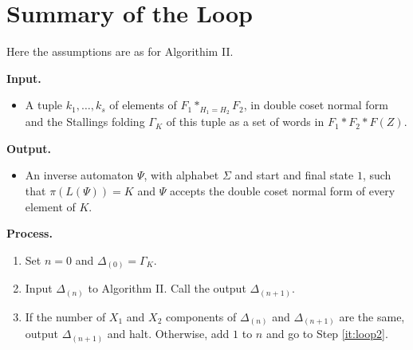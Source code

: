 \documentclass[a4paper,12pt]{article}
\newcommand{\G}{\Gamma }
\newcommand{\D}{\Delta }
\numberwithin{equation}{section}
\numberwithin{figure}{section}
\newcommand{\be}{\begin{enumerate}}
\newcommand{\ee}{\end{enumerate}}
\newcommand{\biz}{\begin{itemize}}
\newcommand{\eiz}{\end{itemize}}
\begin{document}
\section{Summary of the Loop}
Here the assumptions are as for Algorithim II.
 
\noindent\textbf{Input.}
\biz
\item A tuple $k_1, \ldots ,k_s$ of elements of $F_1*_{H_1=H_2}F_2$, 
in double coset normal form and the Stallings folding $\G_K$ of this
tuple as a set of words in $F_1*F_2*F(Z)$. 
\eiz
\noindent\textbf{Output.}
\biz
\item An inverse automaton $\Psi$, with alphabet $\Sigma$ and start 
and final state $1$, such that $\pi(L(\Psi))=K$ and $\Psi$ accepts the
double coset normal form of every element of $K$. 
\eiz
\noindent\textbf{Process.}\\
\be
\item Set $n=0$ and $\D_{(0)}=\G_K$. 
\item\label{it:loop2} Input $\D_{(n)}$ to Algorithm II. Call the output $\D_{(n+1)}$. 
\item If the number of $X_1$ and $X_2$ components of $\D_{(n)}$ and 
$\D_{(n+1)}$ are the same, output $\D_{(n+1)}$ and halt. Otherwise,
 add $1$ to $n$ and go to Step \ref{it:loop2}. 
\ee
\end{document}
